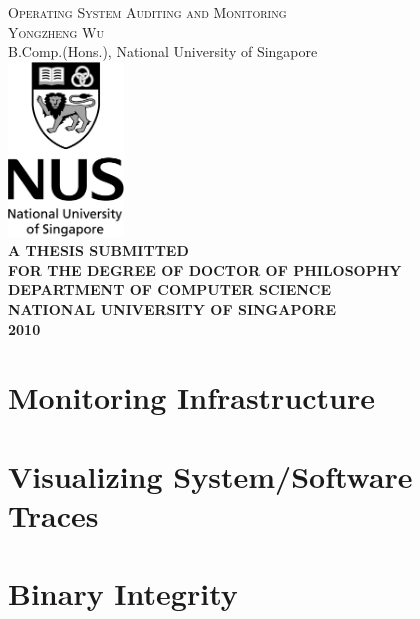 \documentclass[11pt,a4paper,openany]{book}
\begin{document}
\begin{titlepage}
\begin{center}
\textsc{\Huge Operating System Auditing and Monitoring} \\
\vspace{2cm}
\textsc{\huge Yongzheng Wu} \\
{B.Comp.(Hons.), National University of Singapore} \\
\vspace{3cm}
\includegraphics[width=0.23\textwidth]{nus-logo.png} \\
\vspace{5cm}
{\large\bf
A THESIS SUBMITTED \\
\vspace{0.5cm}
FOR THE DEGREE OF DOCTOR OF PHILOSOPHY \\
DEPARTMENT OF COMPUTER SCIENCE \\
NATIONAL UNIVERSITY OF SINGAPORE \\
\vspace{1cm}
2010}
\end{center}
\end{titlepage}

\thispagestyle{empty}

\frontmatter

\tableofcontents

\listoftables
\listoffigures

\mainmatter


  
  
\chapter{Monitoring Infrastructure} \label{sec:mon}
  
  
  

\chapter{Visualizing System/Software Traces} \label{sec:vis}
  
  
  
\chapter{Binary Integrity} \label{sec:auth}
  
  
  


\backmatter


\end{document}
